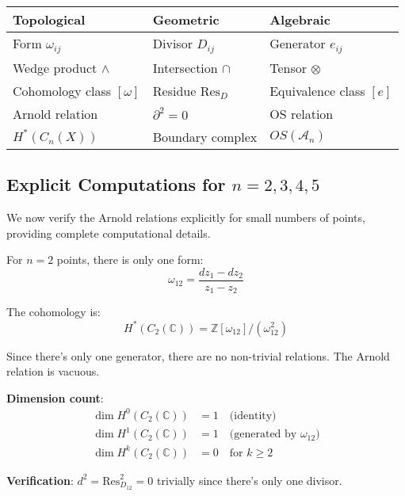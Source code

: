 \begin{corollary}
\label{cor:arnold-dictionary}
\begin{center}
\begin{tabular}{|l|l|l|}
\hline
\textbf{Topological} & \textbf{Geometric} & \textbf{Algebraic}\\
\hline
Form $\omega_{ij}$ & Divisor $D_{ij}$ & Generator $e_{ij}$\\
Wedge product $\wedge$ & Intersection $\cap$ & Tensor $\otimes$\\
Cohomology class $[\omega]$ & Residue $\text{Res}_D$ & Equivalence class $[e]$\\
Arnold relation & $\partial^2 = 0$ & OS relation\\
$H^*(C_n(X))$ & Boundary complex & $OS(\mathcal{A}_n)$\\
\hline
\end{tabular}
\end{center}
\end{corollary}

\subsection{Explicit Computations for $n = 2, 3, 4, 5$}
\label{sec:arnold-explicit-n2345}

We now verify the Arnold relations explicitly for small numbers of points, providing 
complete computational details.

\begin{example}[$n=2$: No Relations]
\label{ex:arnold-n2-complete}

For $n=2$ points, there is only one form:
\begin{equation}
\omega_{12} = \frac{dz_1 - dz_2}{z_1 - z_2}
\end{equation}

The cohomology is:
\begin{equation}
H^*(C_2(\mathbb{C})) = \mathbb{Z}[\omega_{12}] / (\omega_{12}^2)
\end{equation}

Since there's only one generator, there are no non-trivial relations. The Arnold relation 
is vacuous.

\textbf{Dimension count}:
\begin{align}
\dim H^0(C_2(\mathbb{C})) &= 1 \quad \text{(identity)}\\
\dim H^1(C_2(\mathbb{C})) &= 1 \quad \text{(generated by } \omega_{12})\\
\dim H^k(C_2(\mathbb{C})) &= 0 \quad \text{for } k \geq 2
\end{align}

\textbf{Verification}: $d^2 = \text{Res}_{D_{12}}^2 = 0$ trivially since there's only 
one divisor.
\end{example}

